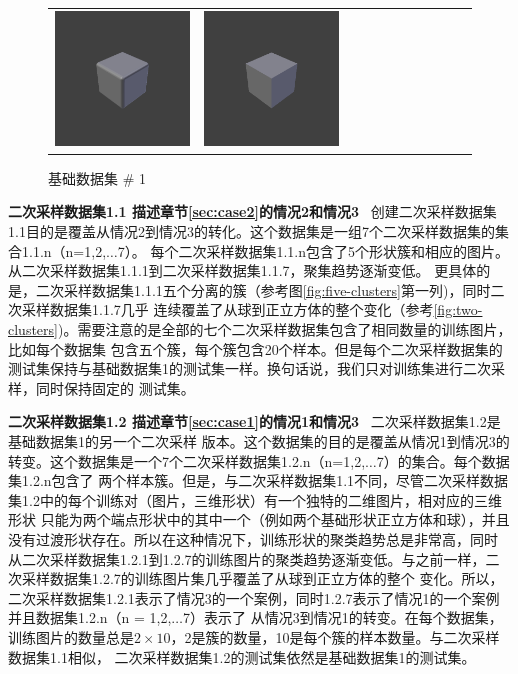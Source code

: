 \documentclass[bachelor, nocolorlinks, printoneside]{seuthesis} %
\begin{document}
\begin{Main}
\begin{figure}
\begin{tabular}{c@{}c@{}c@{}c@{}c@{}c@{}c@{}c@{}c@{}c@{}c@{}}
		\includegraphics[width=.09\textwidth,keepaspectratio]{figs/Isometric9.png} &
		\includegraphics[width=.09\textwidth,keepaspectratio]{figs/Isometric10.png} \\    	
	\end{tabular}
	\caption{\small 基础数据集 \# 1}
    \label{fig:cube-sphere} \vspace{-4mm}
\end{figure}

\textbf{二次采样数据集1.1 描述章节\ref{sec:case2}的情况2和情况3} ~创建二次采样数据集1.1目的是覆盖从情况2到情况3的转化。这个数据集是一组7个二次采样数据集的集合1.1.n（n=1,2,$\ldots$7）。
每个二次采样数据集1.1.n包含了5个形状簇和相应的图片。从二次采样数据集1.1.1到二次采样数据集1.1.7，聚集趋势逐渐变低。
更具体的是，二次采样数据集1.1.1五个分离的簇（参考图\ref{fig:five-clusters}第一列)，同时二次采样数据集1.1.7几乎
连续覆盖了从球到正立方体的整个变化（参考\ref{fig:two-clusters})。需要注意的是全部的七个二次采样数据集包含了相同数量的训练图片，比如每个数据集
包含五个簇，每个簇包含20个样本。但是每个二次采样数据集的测试集保持与基础数据集1的测试集一样。换句话说，我们只对训练集进行二次采样，同时保持固定的
测试集。

\textbf{二次采样数据集1.2 描述章节\ref{sec:case1}的情况1和情况3} ~二次采样数据集1.2是基础数据集1的另一个二次采样
版本。这个数据集的目的是覆盖从情况1到情况3的转变。这个数据集是一个7个二次采样数据集1.2.n（n=1,2,$\ldots$7）的集合。每个数据集1.2.n包含了
两个样本簇。但是，与二次采样数据集1.1不同，尽管二次采样数据集1.2中的每个训练对（图片，三维形状）有一个独特的二维图片，相对应的三维形状
只能为两个端点形状中的其中一个（例如两个基础形状正立方体和球），并且没有过渡形状存在。所以在这种情况下，训练形状的聚类趋势总是非常高，同时
从二次采样数据集1.2.1到1.2.7的训练图片的聚类趋势逐渐变低。与之前一样，二次采样数据集1.2.7的训练图片集几乎覆盖了从球到正立方体的整个
变化。所以，二次采样数据集1.2.1表示了情况3的一个案例，同时1.2.7表示了情况1的一个案例并且数据集1.2.n（n = 1,2,$\ldots$7）表示了
从情况3到情况1的转变。在每个数据集，训练图片的数量总是$2\times10$，2是簇的数量，10是每个簇的样本数量。与二次采样数据集1.1相似，
二次采样数据集1.2的测试集依然是基础数据集1的测试集。


\end{Main}
\end{document}
